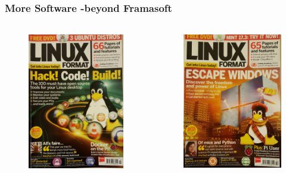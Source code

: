 	\begin{frame}
	\frametitle{More Software -beyond Framasoft}
	\framesubtitle{}
	\begin{columns}
	        	\begin{figure}[h]
               		\centering
                	\includegraphics[width=.8\textwidth]{../pics/LF-201607}
        		\end{figure}
	        	\begin{figure}[h]
                	\centering
                	\includegraphics[width=.8\textwidth]{../pics/LF-201602}

\end{figure}
\end{columns}
\end{frame}
